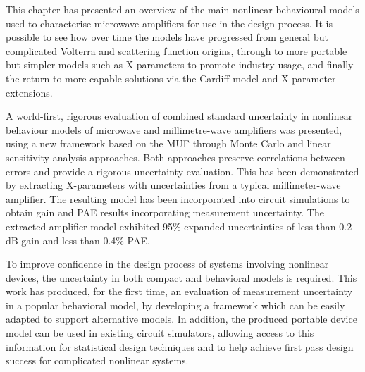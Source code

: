 \documentclass[../thesis/thesis.tex]{subfiles}
\begin{document}
\begin{refsection}
This chapter has presented an overview of the main nonlinear behavioural models used to characterise microwave amplifiers for use in the design process. It is possible to see how over time the models have progressed from general but complicated Volterra and scattering function origins, through to more portable but simpler models such as X-parameters to promote industry usage, and finally the return to more capable solutions via the Cardiff model and X-parameter extensions.

A world-first, rigorous evaluation of combined standard uncertainty in nonlinear behaviour models of microwave and millimetre-wave amplifiers was presented, using a new framework based on the MUF through Monte Carlo and linear sensitivity analysis approaches. Both approaches preserve correlations between errors and provide a rigorous uncertainty evaluation. This has been demonstrated by extracting X-parameters with uncertainties from a typical millimeter-wave amplifier. The resulting model has been incorporated into circuit simulations to obtain gain and PAE results incorporating measurement uncertainty. The extracted amplifier model exhibited 95\% expanded uncertainties of less than 0.2 dB gain and less than 0.4\% PAE. 

To improve confidence in the design process of systems involving nonlinear devices, the uncertainty in both compact and behavioral models is required. This work has produced, for the first time, an evaluation of measurement uncertainty in a popular behavioral model, by developing a framework which can be easily adapted to support alternative models. In addition, the produced portable device model can be used in existing circuit simulators, allowing access to this information for statistical design techniques and to help achieve first pass design success for complicated nonlinear systems.

\printbibliography[title=References]
\end{refsection}
\end{document}
